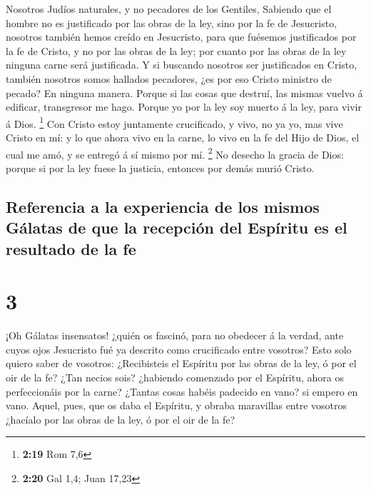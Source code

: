  Nosotros Judíos naturales, y no pecadores de los
Gentiles,  Sabiendo que el hombre no es justificado por
las obras de la ley, sino por la fe de Jesucristo, nosotros también
hemos creído en Jesucristo, para que fuésemos justificados por la fe de
Cristo, y no por las obras de la ley; por cuanto por las obras de la ley
ninguna carne será justificada.  Y si buscando nosotros
ser justificados en Cristo, también nosotros somos hallados pecadores,
¿es por eso Cristo ministro de pecado? En ninguna manera.
 Porque si las cosas que destruí, las mismas vuelvo á
edificar, transgresor me hago.  Porque yo por la ley soy
muerto á la ley, para vivir á Dios. \footnote{\textbf{2:19} Rom 7,6}
 Con Cristo estoy juntamente crucificado, y vivo, no ya
yo, mas vive Cristo en mí: y lo que ahora vivo en la carne, lo vivo en
la fe del Hijo de Dios, el cual me amó, y se entregó á sí mismo por mí.
\footnote{\textbf{2:20} Gal 1,4; Juan 17,23}  No desecho
la gracia de Dios: porque si por la ley fuese la justicia, entonces por
demás murió Cristo.

\hypertarget{referencia-a-la-experiencia-de-los-mismos-guxe1latas-de-que-la-recepciuxf3n-del-espuxedritu-es-el-resultado-de-la-fe}{%
\subsection{Referencia a la experiencia de los mismos Gálatas de que la
recepción del Espíritu es el resultado de la
fe}\label{referencia-a-la-experiencia-de-los-mismos-guxe1latas-de-que-la-recepciuxf3n-del-espuxedritu-es-el-resultado-de-la-fe}}

\hypertarget{section-2}{%
\section{3}\label{section-2}}

 ¡Oh Gálatas insensatos! ¿quién os fascinó, para no
obedecer á la verdad, ante cuyos ojos Jesucristo fué ya descrito como
crucificado entre vosotros?  Esto solo quiero saber de
vosotros: ¿Recibisteis el Espíritu por las obras de la ley, ó por el oir
de la fe?  ¿Tan necios sois? ¿habiendo comenzado por el
Espíritu, ahora os perfeccionáis por la carne?  ¿Tantas
cosas habéis padecido en vano? si empero en vano.  Aquel,
pues, que os daba el Espíritu, y obraba maravillas entre vosotros
¿hacíalo por las obras de la ley, ó por el oir de la fe?

